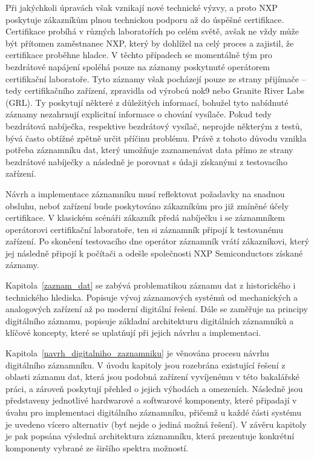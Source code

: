 Při jakýchkoli úpravách však vznikají nové technické výzvy, a proto NXP poskytuje zákazníkům plnou technickou podporu až do úspěšné certifikace. Certifikace probíhá v různých laboratořích po celém světě, avšak ne vždy může být přítomen zaměstnanec NXP, který by dohlížel na celý proces a zajistil, že certifikace proběhne hladce. V těchto případech se momentálně tým pro bezdrátové napájení spoléhá pouze na záznamy poskytnuté operátorem certifikační laboratoře. Tyto záznamy však pocházejí pouze ze strany přijímače – tedy certifikačního zařízení, zpravidla od výrobců nok9 nebo Granite River Labs (GRL). Ty poskytují některé z důležitých informací, bohužel tyto nabídnuté záznamy nezahrnují explicitní informace o chování vysílače. Pokud tedy bezdrátová nabíječka, respektive bezdrátový vysílač, neprojde některým z testů, bývá často obtížné zpětně určit příčinu problému. Právě z tohoto důvodu vznikla potřeba záznamníku dat, který umožňuje zaznamenávat data přímo ze strany bezdrátové nabíječky a následně je porovnat s údaji získanými z testovacího zařízení. \cite{nxp_wireless_charging_team}

Návrh a implementace záznamníku musí reflektovat požadavky na snadnou obsluhu, neboť zařízení bude poskytováno zákazníkům pro již zmíněné účely certifikace. V klasickém scénáři zákazník předá nabíječku i se záznamníkem operátorovi certifikační laboratoře, ten si záznamník připojí k testovanému zařízení. Po skončení testovacího dne operátor záznamník vrátí zákazníkovi, který jej následně připojí k počítači a odešle společnosti NXP Semiconductors získané záznamy.

Kapitola~\ref{zaznam_dat} se zabývá problematikou záznamu dat z historického i technického hlediska. Popisuje vývoj záznamových systémů od mechanických a analogových zařízení až po moderní digitální řešení. Dále se zaměřuje na principy digitálního záznamu, popisuje základní architekturu digitálních záznamníků a klíčové koncepty, které se uplatňují při jejich návrhu a implementaci.

Kapitola~\ref{navrh_digitalniho_zaznamniku}  je věnována procesu návrhu digitálního záznamníku. V úvodu kapitoly jsou rozebrána existující řešení z oblasti záznamu dat, která jsou podobná zařízení vyvíjenému v této bakalářské práci, a zároveň poskytují přehled o jejich výhodách a omezeních. Následně jsou představeny jednotlivé hardwarové a softwarové komponenty, které připadají v úvahu pro implementaci digitálního záznamníku, přičemž u každé části systému je uvedeno vícero alternativ (byť nejde o jediná možná řešení). V závěru kapitoly je pak popsána výsledná architektura záznamníku, která prezentuje konkrétní komponenty vybrané ze širšího spektra možností.

